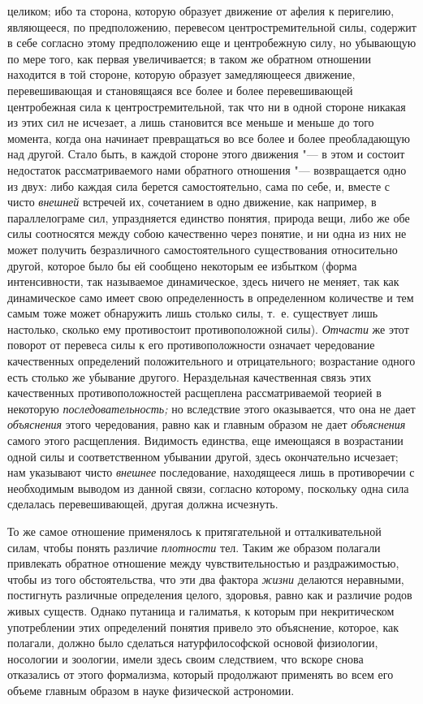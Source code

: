 целиком; ибо та сторона, которую образует движение от афелия к перигелию,
являющееся, по предположению, перевесом центростремительной силы, содержит в
себе согласно этому предположению еще и центробежную силу, но убывающую по мере
того, как первая увеличивается; в таком же обратном отношении находится в той
стороне, которую образует замедляющееся движение, перевешивающая и становящаяся
все более и более перевешивающей центробежная сила к центростремительной, так
что ни в одной стороне никакая из этих сил не исчезает, а лишь становится все
меньше и меньше до того момента, когда она начинает превращаться во все более и
более преобладающую над другой. Стало быть, в каждой стороне этого движения
"--- в этом и состоит недостаток рассматриваемого нами обратного отношения "---
возвращается одно из двух: либо каждая сила берется самостоятельно, сама по
себе, и, вместе с чисто {\em внешней} встречей их, сочетанием в одно движение,
как например, в параллелограме сил, упраздняется единство понятия, природа
вещи, либо же обе силы соотносятся между собою качественно через понятие, и ни
одна из них не может получить безразличного самостоятельного существования
относительно другой, которое было бы ей сообщено некоторым ее избытком (форма
интенсивности, так называемое динамическое, здесь ничего не меняет, так как
динамическое само имеет свою определенность в определенном количестве и тем
самым тоже может обнаружить лишь столько силы, т.~е. существует лишь настолько,
сколько ему противостоит противоположной силы). {\em Отчасти} же этот поворот
от перевеса силы к его противоположности означает чередование качественных
определений положительного и отрицательного; возрастание одного есть столько же
убывание другого. Нераздельная качественная связь этих качественных
противоположностей расщеплена рассматриваемой теорией в некоторую
{\em последовательность;} но вследствие этого оказывается, что она не дает
{\em объяснения} этого чередования, равно как и главным образом не дает
{\em объяснения} самого этого расщепления. Видимость единства, еще имеющаяся в
возрастании одной силы и соответственном убывании другой, здесь окончательно
исчезает; нам указывают чисто {\em внешнее} последование, находящееся лишь в
противоречии с необходимым выводом из данной связи, согласно которому,
поскольку одна сила сделалась перевешивающей, другая должна исчезнуть.

То же самое отношение применялось к притягательной и отталкивательной силам,
чтобы понять различие {\em плотности} тел. Таким же образом полагали привлекать
обратное отношение между чувствительностью и раздражимостью, чтобы из того
обстоятельства, что эти два фактора {\em жизни} делаются неравными, постигнуть
различные определения целого, здоровья, равно как и различие родов живых
существ. Однако путаница и галиматья, к которым при некритическом употреблении
этих определений понятия привело это объяснение, которое, как полагали, должно
было сделаться натурфилософской основой физиологии, носологии и зоологии, имели
здесь своим следствием, что вскоре снова отказались от этого формализма,
который продолжают применять во всем его объеме главным образом в науке
физической астрономии.


